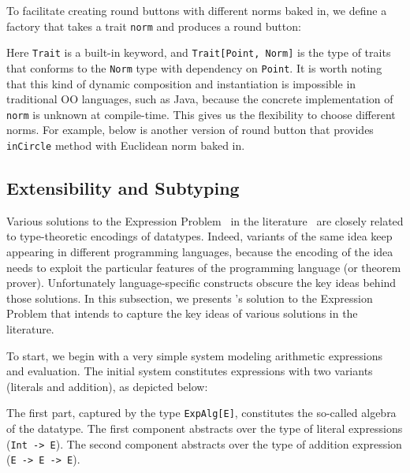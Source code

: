 To facilitate creating round buttons with different norms baked in, we define a
factory that takes a trait \lstinline$norm$ and produces a round button:

Here \lstinline{Trait} is a built-in keyword, and \lstinline$Trait[Point, Norm]$
is the type of traits that conforms to the \lstinline$Norm$ type with dependency
on \lstinline{Point}. It is worth noting that this kind of dynamic composition
and instantiation is impossible in traditional OO languages, such as Java,
because the concrete implementation of \lstinline{norm} is unknown at
compile-time. This gives us the flexibility to choose different norms. For
example, below is another version of round button that provides
\lstinline{inCircle} method with Euclidean norm baked in.



\subsection{Extensibility and Subtyping}
\label{sec:extensibility}

Various solutions to the Expression Problem~\cite{wadler1998expression} in the
literature~\cite{finally-tagless,oliveira09modular,DelawareOS13,oliveira2012extensibility,
  swierstra:la-carte} are closely related to type-theoretic encodings of
datatypes. Indeed, variants of the same idea keep appearing in different
programming languages, because the encoding of the idea needs to exploit the
particular features of the programming language (or theorem prover).
Unfortunately language-specific constructs obscure the key ideas behind those
solutions. In this subsection, we presents \name's solution to the Expression
Problem that intends to capture the key ideas of various solutions in the
literature.

To start, we begin with a very simple system modeling arithmetic expressions and
evaluation. The initial system constitutes expressions with two variants
(literals and addition), as depicted below:

The first part, captured by the type \lstinline{ExpAlg[E]}, constitutes the
so-called algebra of the datatype. The first component abstracts over the type
of literal expressions (\lstinline{Int -> E}). The second component abstracts
over the type of addition expression (\lstinline{E -> E -> E}).

